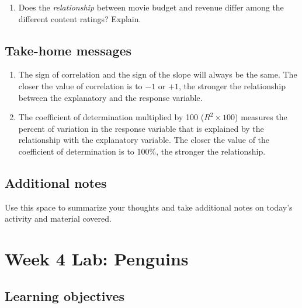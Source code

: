 \documentclass[
]{report}
\providecommand{\tightlist}{%
  \setlength{\itemsep}{0pt}\setlength{\parskip}{0pt}}
\begin{document}
\vspace{0.5in}

\begin{enumerate}
\def\labelenumi{\arabic{enumi}.}
\setcounter{enumi}{14}
\tightlist
\item
  Does the \emph{relationship} between movie budget and revenue differ among the different content ratings? Explain.
\end{enumerate}

\vspace{0.8in}
\newpage

\hypertarget{take-home-messages-7}{%
\subsection{Take-home messages}\label{take-home-messages-7}}

\begin{enumerate}
\def\labelenumi{\arabic{enumi}.}
\item
  The sign of correlation and the sign of the slope will always be the same. The closer the value of correlation is to \(-1\) or \(+1\), the stronger the relationship between the explanatory and the response variable.
\item
  The coefficient of determination multiplied by 100 (\(R^2 \times 100\)) measures the percent of variation in the response variable that is explained by the relationship with the explanatory variable. The closer the value of the coefficient of determination is to 100\%, the stronger the relationship.
\end{enumerate}

\newpage

\hypertarget{additional-notes-7}{%
\subsection{Additional notes}\label{additional-notes-7}}

Use this space to summarize your thoughts and take additional notes on today's activity and material covered.

\newpage

\hypertarget{week-4-lab-penguins}{%
\section{Week 4 Lab: Penguins}\label{week-4-lab-penguins}}


\hypertarget{learning-objectives-4}{%
\subsection{Learning objectives}\label{learning-objectives-4}}
\end{document}

